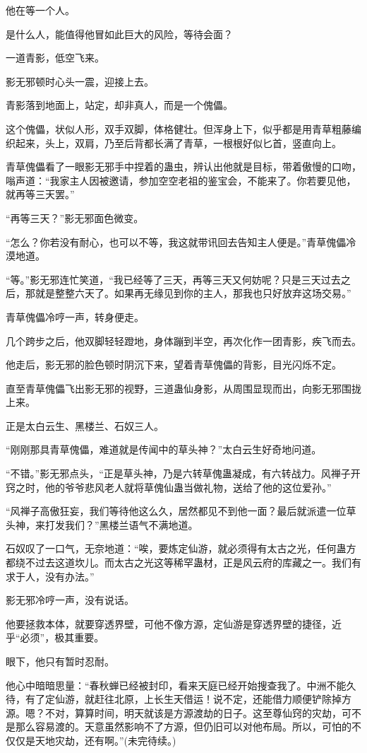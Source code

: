 \begin{this_body}
他在等一个人。

是什么人，能值得他冒如此巨大的风险，等待会面？

一道青影，低空飞来。

影无邪顿时心头一震，迎接上去。

青影落到地面上，站定，却非真人，而是一个傀儡。

这个傀儡，状似人形，双手双脚，体格健壮。但浑身上下，似乎都是用青草粗藤编织起来，头上，双肩，乃至后背都长满了青草，一根根好似匕首，竖直向上。

青草傀儡看了一眼影无邪手中捏着的蛊虫，辨认出他就是目标，带着傲慢的口吻，嗡声道：“我家主人因被邀请，参加空空老祖的鉴宝会，不能来了。你若要见他，就再等三天罢。”

“再等三天？”影无邪面色微变。

“怎么？你若没有耐心，也可以不等，我这就带讯回去告知主人便是。”青草傀儡冷漠地道。

“等。”影无邪连忙笑道，“我已经等了三天，再等三天又何妨呢？只是三天过去之后，那就是整整六天了。如果再无缘见到你的主人，那我也只好放弃这场交易。”

青草傀儡冷哼一声，转身便走。

几个跨步之后，他双脚轻轻蹬地，身体蹦到半空，再次化作一团青影，疾飞而去。

他走后，影无邪的脸色顿时阴沉下来，望着青草傀儡的背影，目光闪烁不定。

直至青草傀儡飞出影无邪的视野，三道蛊仙身影，从周围显现而出，向影无邪围拢上来。

正是太白云生、黑楼兰、石奴三人。

“刚刚那具青草傀儡，难道就是传闻中的草头神？”太白云生好奇地问道。

“不错。”影无邪点头，“正是草头神，乃是六转草傀蛊凝成，有六转战力。风禅子开窍之时，他的爷爷悲风老人就将草傀仙蛊当做礼物，送给了他的这位爱孙。”

“风禅子高傲狂妄，我们等待他这么久，居然都见不到他一面？最后就派遣一位草头神，来打发我们？”黑楼兰语气不满地道。

石奴叹了一口气，无奈地道：“唉，要炼定仙游，就必须得有太古之光，任何蛊方都绕不过去这道坎儿。而太古之光这等稀罕蛊材，正是风云府的库藏之一。我们有求于人，没有办法。”

影无邪冷哼一声，没有说话。

他要拯救本体，就要穿透界壁，可他不像方源，定仙游是穿透界壁的捷径，近乎“必须”，极其重要。

眼下，他只有暂时忍耐。

他心中暗暗思量：“春秋蝉已经被封印，看来天庭已经开始搜查我了。中洲不能久待，有了定仙游，就赶往北原，上长生天借运！说不定，还能借力顺便铲除掉方源。嗯？不对，算算时间，明天就该是方源渡劫的日子。这至尊仙窍的灾劫，可不是那么容易渡的。天意虽然影响不了方源，但仍旧可以对他布局。所以，可怕的不仅仅是天地灾劫，还有啊。”(未完待续。)

\end{this_body}

